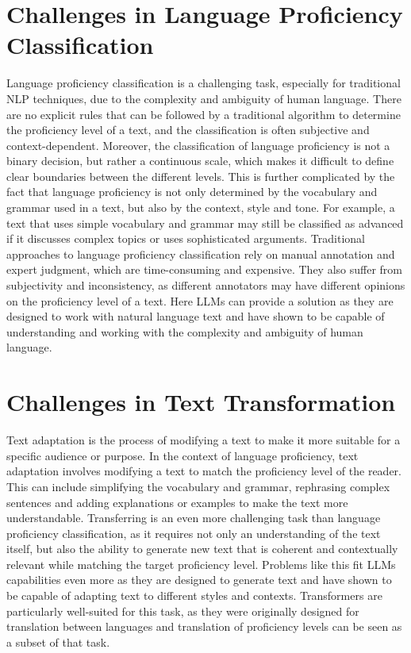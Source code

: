 \section{Challenges in Language Proficiency Classification}
\label{s:background_challenges_classification}
Language proficiency classification is a challenging task, especially for traditional NLP techniques, due to the complexity and ambiguity of human language. There are no explicit rules that can be followed by a traditional algorithm to determine the proficiency level of a text, and the classification is often subjective and context-dependent. Moreover, the classification of language proficiency is not a binary decision, but rather a continuous scale, which makes it difficult to define clear boundaries between the different levels. This is further complicated by the fact that language proficiency is not only determined by the vocabulary and grammar used in a text, but also by the context, style and tone. For example, a text that uses simple vocabulary and grammar may still be classified as advanced if it discusses complex topics or uses sophisticated arguments. Traditional approaches to language proficiency classification rely on manual annotation and expert judgment, which are time-consuming and expensive. They also suffer from subjectivity and inconsistency, as different annotators may have different opinions on the proficiency level of a text. Here LLMs can provide a solution as they are designed to work with natural language text and have shown to be capable of understanding and working with the complexity and ambiguity of human language.
\section{Challenges in Text Transformation}
\label{s:background_challenges_transformation}
Text adaptation is the process of modifying a text to make it more suitable for a specific audience or purpose. In the context of language proficiency, text adaptation involves modifying a text to match the proficiency level of the reader. This can include simplifying the vocabulary and grammar, rephrasing complex sentences  and adding explanations or examples to make the text more understandable. Transferring is an even more challenging task than language proficiency classification, as it requires not only an understanding of the text itself, but also the ability to generate new text that is coherent and contextually relevant while matching the target proficiency level. Problems like this fit LLMs capabilities even more as they are designed to generate text and have shown to be capable of adapting text to different styles and contexts. Transformers are particularly well-suited for this task, as they were originally designed for translation between languages \citep{Vaswani2017} and translation of proficiency levels can be seen as a subset of that task.
